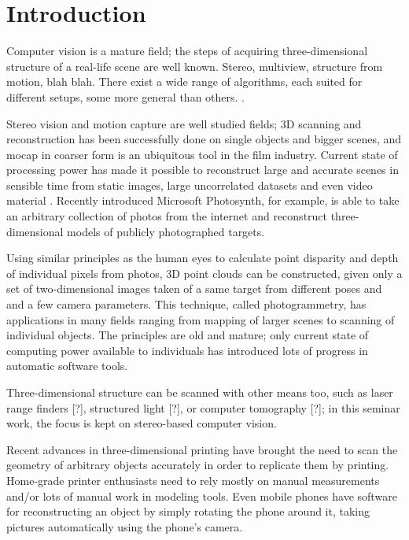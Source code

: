 \section{Introduction}
\thispagestyle{empty}

Computer vision is a mature field; the steps of acquiring three-dimensional structure of a real-life scene are well known.
Stereo, multiview, structure from motion, blah blah. There exist a wide range of algorithms, each suited for different setups, some more general than others. \cite{seitz2006comparison}.

Stereo vision and motion capture are well studied fields; 3D scanning and reconstruction has been successfully done on single objects and bigger scenes, and mocap in coarser form is an ubiquitous tool in the film industry.
Current state of processing power has made it possible to reconstruct large and accurate scenes in sensible time from static images, large uncorrelated datasets and even video material \cite{goesele2007multi, furukawa2010towards, TODOSOMETHINGVIDEO}.
Recently introduced Microsoft Photosynth, for example, is able to take an arbitrary collection of photos from the internet and reconstruct three-dimensional models of publicly photographed targets.

Using similar principles as the human eyes to calculate point disparity and depth of individual pixels from photos, 3D point clouds can be constructed, given only a set of two-dimensional images taken of a same target from different poses and and a few camera parameters.
This technique, called photogrammetry, has applications in many fields ranging from mapping of larger scenes to scanning of individual objects.
The principles are old and mature; only current state of computing power available to individuals has introduced lots of progress in automatic software tools.

Three-dimensional structure can be scanned with other means too, such as laser range finders [?], structured light [?], or computer tomography [?]; in this seminar work, the focus is kept on stereo-based computer vision.

Recent advances in three-dimensional printing have brought the need to scan the geometry of arbitrary objects accurately in order to replicate them by printing.
Home-grade printer enthusiasts need to rely mostly on manual measurements and/or lots of manual work in modeling tools.
Even mobile phones have software for reconstructing an object by simply rotating the phone around it, taking pictures automatically using the phone's camera.

